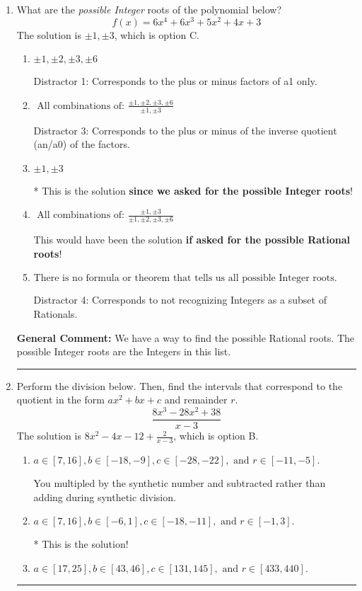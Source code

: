\documentclass{extbook}[14pt]
\newcommand{\litem}[1]{\item #1

\rule{\textwidth}{0.4pt}}
\begin{document}
\begin{enumerate}\litem{
What are the \textit{possible Integer} roots of the polynomial below?
\[ f(x) = 6x^{4} +6 x^{3} +5 x^{2} +4 x + 3 \]The solution is \( \pm 1,\pm 3 \), which is option C.\begin{enumerate}[label=\Alph*.]
\item \( \pm 1,\pm 2,\pm 3,\pm 6 \)

 Distractor 1: Corresponds to the plus or minus factors of a1 only.
\item \( \text{ All combinations of: }\frac{\pm 1,\pm 2,\pm 3,\pm 6}{\pm 1,\pm 3} \)

 Distractor 3: Corresponds to the plus or minus of the inverse quotient (an/a0) of the factors. 
\item \( \pm 1,\pm 3 \)

* This is the solution \textbf{since we asked for the possible Integer roots}!
\item \( \text{ All combinations of: }\frac{\pm 1,\pm 3}{\pm 1,\pm 2,\pm 3,\pm 6} \)

This would have been the solution \textbf{if asked for the possible Rational roots}!
\item \( \text{There is no formula or theorem that tells us all possible Integer roots.} \)

 Distractor 4: Corresponds to not recognizing Integers as a subset of Rationals.
\end{enumerate}

\textbf{General Comment:} We have a way to find the possible Rational roots. The possible Integer roots are the Integers in this list.
}
\litem{
Perform the division below. Then, find the intervals that correspond to the quotient in the form $ax^2+bx+c$ and remainder $r$.
\[ \frac{8x^{3} -28 x^{2} + 38}{x -3} \]The solution is \( 8x^{2} -4 x -12 + \frac{2}{x -3} \), which is option B.\begin{enumerate}[label=\Alph*.]
\item \( a \in [7, 16], b \in [-18, -9], c \in [-28, -22], \text{ and } r \in [-11, -5]. \)

 You multipled by the synthetic number and subtracted rather than adding during synthetic division.
\item \( a \in [7, 16], b \in [-6, 1], c \in [-18, -11], \text{ and } r \in [-1, 3]. \)

* This is the solution!
\item \( a \in [17, 25], b \in [43, 46], c \in [131, 145], \text{ and } r \in [433, 440]. \)


\end{enumerate}}
\end{enumerate}
\end{document}
